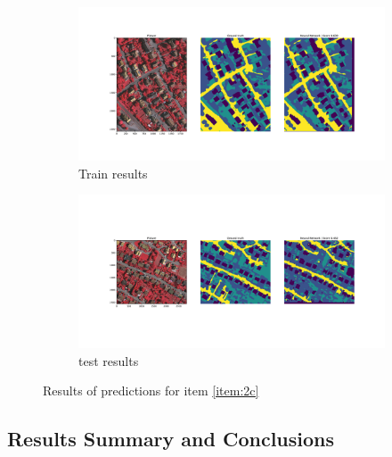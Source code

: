 \documentclass[10pt, a4paper]{article}
\begin{document}
\begin{figure}[htpb]
  \centering
  \begin{subfigure}[b]{1.0\textwidth}
      \centering
      \includegraphics[width=\textwidth]{images/Patch128_scratch_train.pdf}
      \caption{Train results}
      \label{fig:q2c_train}
  \end{subfigure}
  \hfill
  \begin{subfigure}[b]{1.0\textwidth}
    \centering
    \includegraphics[width=\textwidth]{images/Patch128_scratch_test.pdf}
    \caption{test results}
    \label{fig:q2c_test}
  \end{subfigure}
  \caption{Results of predictions for item \ref{item:2c}}
  \label{fig:q2c_results}
\end{figure}

\subsection{Results Summary and Conclusions}
\end{document}
